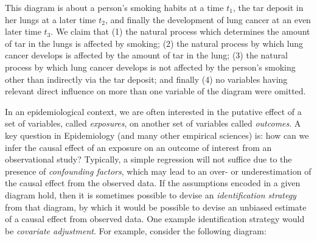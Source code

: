 \documentclass[a4paper]{article} %
\begin{document}
\begin{center}
\end{center}

This diagram is about a person's smoking habits at a time $t_1$,
the tar deposit in her lungs at a later time $t_2$, and finally the
development of lung cancer at an even later time $t_3$. We claim that 
(1) the natural process which determines the amount of tar in the
lungs is affected by smoking; 
(2) the natural process by which lung cancer develops is affected by
the amount of tar in the lung; (3) the natural 
process by which lung cancer develops is not affected by the person's
smoking other than indirectly via the tar deposit; 
and finally (4) no variables having
relevant direct influence on more than one variable
of the diagram were omitted.

In an epidemiological context, we are often interested in the putative 
effect of a set of variables, called \emph{exposures}, on another set of variables
called \emph{outcomes}. A key question in Epidemiology (and many other empirical sciences)
is: how can we infer the causal effect of an exposure on an outcome of interest from
an observational study? Typically, a simple regression will not suffice due to the 
presence of \emph{confounding factors}, which may lead to an over- or underestimation
of the causal effect from the observed data. If the assumptions encoded in a given 
diagram hold, then it is sometimes possible to devise an \emph{identification strategy}
from that diagram, by which it would be possible to devise an unbiased estimate 
of a causal effect from observed data. One example identification strategy would
be \emph{covariate adjustment}. For example,
consider the following diagram: 

\begin{center}
\end{center}
\end{document}
